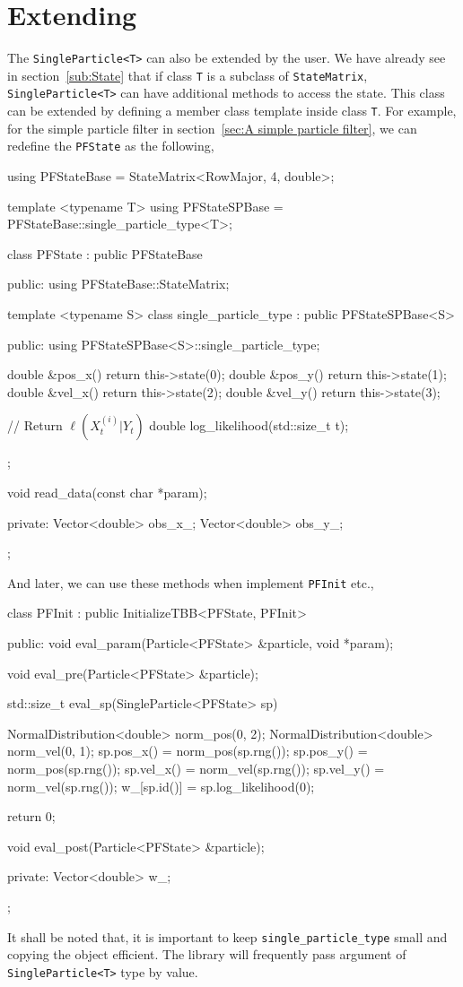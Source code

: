 \section{Extending \protect\spt}
\label{sec:Extending SP}

The \verb|SingleParticle<T>| can also be extended by the user. We have already
see in section~\ref{sub:State} that if class \verb|T| is a subclass of
\verb|StateMatrix|, \verb|SingleParticle<T>| can have additional methods to
access the state. This class can be extended by defining a member class
template inside class \verb|T|. For example, for the simple particle filter in
section~\ref{sec:A simple particle filter}, we can redefine the \verb|PFState|
as the following,
\begin{cppcode}
  using PFStateBase = StateMatrix<RowMajor, 4, double>;

  template <typename T>
  using PFStateSPBase = PFStateBase::single_particle_type<T>;

  class PFState : public PFStateBase
  {
      public:
      using PFStateBase::StateMatrix;

      template <typename S>
      class single_particle_type : public PFStateSPBase<S>
      {
          public:
          using PFStateSPBase<S>::single_particle_type;

          double &pos_x() { return this->state(0); }
          double &pos_y() { return this->state(1); }
          double &vel_x() { return this->state(2); }
          double &vel_y() { return this->state(3); }

          // Return $\ell(X_t^{(i)}|Y_t)$
          double log_likelihood(std::size_t t);
      };

      void read_data(const char *param);

      private:
      Vector<double> obs_x_;
      Vector<double> obs_y_;
  };
\end{cppcode}
And later, we can use these methods when implement \verb|PFInit| etc.,
\begin{cppcode}
  class PFInit : public InitializeTBB<PFState, PFInit>
  {
      public:
      void eval_param(Particle<PFState> &particle, void *param);

      void eval_pre(Particle<PFState> &particle);

      std::size_t eval_sp(SingleParticle<PFState> sp)
      {
          NormalDistribution<double> norm_pos(0, 2);
          NormalDistribution<double> norm_vel(0, 1);
          sp.pos_x() = norm_pos(sp.rng());
          sp.pos_y() = norm_pos(sp.rng());
          sp.vel_x() = norm_vel(sp.rng());
          sp.vel_y() = norm_vel(sp.rng());
          w_[sp.id()] = sp.log_likelihood(0);

          return 0;
      }

      void eval_post(Particle<PFState> &particle);

      private:
      Vector<double> w_;
  };
\end{cppcode}
It shall be noted that, it is important to keep \verb|single_particle_type|
small and copying the object efficient. The library will frequently pass
argument of \verb|SingleParticle<T>| type by value.

